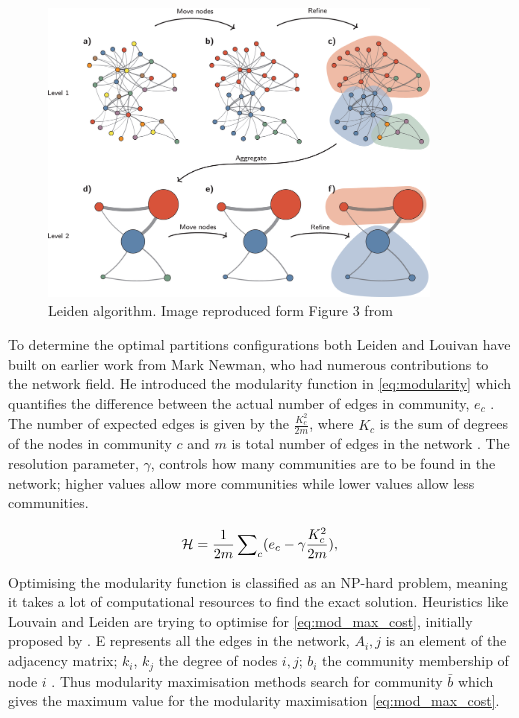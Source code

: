 \begin{figure}[!htb]    
    \centering
\includegraphics[width=0.9\textwidth,height=0.9\textheight,keepaspectratio]{Sections/Lit_review/Resources/Leiden_algorithm.png}
    \caption[Leiden algorithm]{Leiden algorithm. Image reproduced form Figure 3 from \citet{Traag2019-ne}}
    \label{fig:N_I:leiden-explained}
\end{figure}



To determine the optimal partitions configurations both Leiden and Louivan have built on earlier work from Mark Newman, who had numerous contributions to the network field. He introduced the modularity function in \cref{eq:modularity} which quantifies the difference between the actual number of edges in community, $e_c$ \citep{Newman2004-dd}. The number of expected edges is given by the $\frac{K_c^2}{2m}$, where $K_c$ is the sum of degrees of the nodes in community $c$ and $m$ is total number of edges in the network \citep{Traag2019-ne}. The resolution parameter, $\gamma$, controls how many communities are to be found in the network; higher values allow more communities while lower values allow less communities.


\begin{equation} \label{eq:modularity}
    {\mathcal H} =\frac{1}{2m}\,{\sum }_{c}({e}_{c}-{\rm{\gamma }}\frac{{K}_{c}^{2}}{2m}),
\end{equation}

Optimising the modularity function is classified as an NP-hard problem, meaning it takes a lot of computational resources to find the exact solution. Heuristics like Louvain and Leiden are trying to optimise for \cref{eq:mod_max_cost}, initially proposed by \cite{Newman2006-fa}. E represents all the edges in the network, $A_i,j$ is an element of the adjacency matrix; $k_i$, $k_j$ the degree of nodes $i,j$; $b_i$ the community membership of node $i$ \citep{Peixoto2021-jx}. Thus modularity maximisation methods search for community $\bar{b}$ which gives the maximum value for the modularity maximisation \cref{eq:mod_max_cost}.

